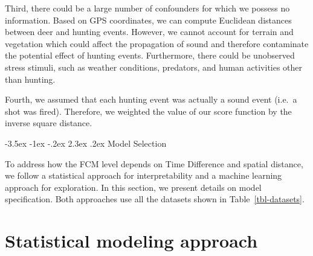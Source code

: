 \documentclass[
  letterpaper,
  DIV=11,
  numbers=noendperiod,
  twocolumn,
  open=any]{scrreprt}
\makeatletter
\renewcommand\chapter{\@startsection{chapter}{0}{\z@}%
  {-3.5ex \@plus -1ex \@minus -.2ex}%
  {2.3ex \@plus.2ex}%
  {\normalfont\Large\bfseries}}
\makeatother
\begin{document}
Third, there could be a large number of confounders for which we possess
no information. Based on GPS coordinates, we can compute Euclidean
distances between deer and hunting events. However, we cannot account
for terrain and vegetation which could affect the propagation of sound
and therefore contaminate the potential effect of hunting events.
Furthermore, there could be unobserved stress stimuli, such as weather
conditions, predators, and human activities other than hunting.

Fourth, we assumed that each hunting event was actually a sound event
(i.e.~a shot was fired). Therefore, we weighted the value of our score
function by the inverse square distance.

\chapter{Model Selection}\label{model-selection}

To address how the FCM level depends on Time Difference and spatial
distance, we follow a statistical approach for interpretability and a
machine learning approach for exploration. In this section, we present
details on model specification. Both approaches use all the datasets
shown in Table~\ref{tbl-datasets}.

\begin{table}

\caption{\label{tbl-datasets}Count of individual deer and faecal sample
for each of the proposed DataSets.}


\end{table}%

\section{Statistical modeling approach}\label{sec-stat_model}
\end{document}
